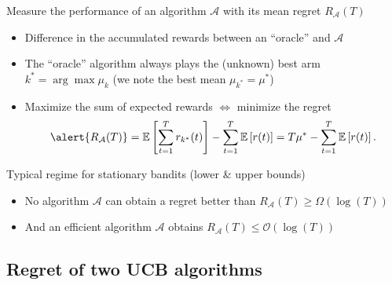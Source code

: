 \documentclass[11pt,english,ignorenonframetext,]{beamer}
\begin{document}
\begin{frame}{Measure the performance of an algorithm $\mathcal{A}$ with its mean regret $R_{\mathcal{A}}(T)$}

\begin{itemize}
  \item
  Difference in the accumulated rewards between an ``oracle'' and $\mathcal{A}$

  \item
  The ``oracle'' algorithm always plays the (unknown) best arm $k^* = \arg\max \mu_k$ (we note the best mean $\mu_{k^*} = \mu^*$)

  \item
  Maximize the sum of expected rewards
  $\Longleftrightarrow$ \alert{minimize the regret}
  \[ \alert{ R_{\mathcal{A}}(T) } = \mathbb{E}\left[ \sum\limits_{t=1}^T r_{k^*}(t) \right] - \sum\limits_{t=1}^T \mathbb{E}\left[ r(t) \right] = T \mu^* - \sum\limits_{t=1}^T \mathbb{E}\left[ r(t) \right]. \]

\end{itemize}

\pause
\vspace*{10pt}

\begin{exampleblock}{Typical regime for stationary bandits (lower \& upper bounds)}
  \begin{itemize}
  \item
  No algorithm $\mathcal{A}$ can obtain a regret better than
  \hfill{}
  $R_{\mathcal{A}}(T) \geq \Omega(\log(T))$

  \item
  And an efficient algorithm $\mathcal{A}$ obtains
  \hfill{}
  $R_{\mathcal{A}}(T) \leq \mathcal{O}(\log(T))$
  \end{itemize}
\end{exampleblock}

\end{frame}

\subsection{\hfill{}Regret of two UCB algorithms\hfill{}}
\end{document}
